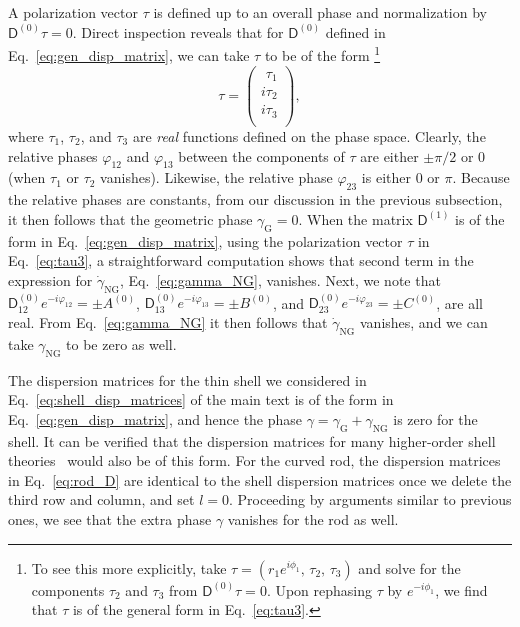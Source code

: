 \begin{subappendices}
A polarization vector $\tau$ is defined up to an overall phase and normalization by $\mathsf{D}^{(0)}\tau = 0$.
Direct inspection reveals that for $\mathsf{D}^{(0)}$ defined in Eq.~\eqref{eq:gen_disp_matrix}, we can take $\tau$ to be of the form%
\footnote{To see this more explicitly, take $\tau = (r_{1}e^{i\phi_{1}},\, \tau_{2},\, \tau_{3})$ and solve for the components $\tau_{2}$ and $\tau_{3}$ from $\mathsf{D}^{(0)}\tau = 0$.
  Upon rephasing $\tau$ by $e^{-i\phi_{1}}$, we find that $\tau$ is of the general form in Eq.~\eqref{eq:tau3}.
}
%
\begin{equation}
  \tau =
  \begin{pmatrix}
    \phantom{i}\tau_{1}\\
    i\tau_{2}\\
    i\tau_{3}\\
  \end{pmatrix},
  \label{eq:tau3}
\end{equation}
%
where $\tau_{1}$, $\tau_{2}$, and $\tau_{3}$ are \emph{real} functions defined on the phase space.
Clearly, the relative phases $\varphi_{12}$ and $\varphi_{13}$ between the components of $\tau$ are either $\pm \pi/2$ or $0$ (when $\tau_{1}$ or $\tau_{2}$ vanishes).
Likewise, the relative phase $\varphi_{23}$ is either $0$ or $\pi$.
Because the relative phases are constants, from our discussion in the previous subsection, it then follows that the geometric phase $\gamma_{\text{G}} = 0$.
When the matrix $\mathsf{D}^{(1)}$ is of the form in Eq.~\eqref{eq:gen_disp_matrix}, using the polarization vector $\tau$ in Eq.~\eqref{eq:tau3}, a straightforward computation shows that second term in the expression for $\dot{\gamma}_{\text{NG}}$, Eq.~\eqref{eq:gamma_NG}, vanishes.
Next, we note that $\mathsf{D}_{12}^{(0)}e^{-i\varphi_{12}} = \pm A^{(0)}$, $\mathsf{D}_{13}^{(0)}e^{-i\varphi_{13}} = \pm B^{(0)}$, and $\mathsf{D}_{23}^{(0)}e^{-i\varphi_{23}} = \pm C^{(0)}$, are all real.
From Eq.~\eqref{eq:gamma_NG} it then follows that $\dot{\gamma}_{\text{NG}}$ vanishes, and we can take $\gamma_{\text{NG}}$ to be zero as well.

The dispersion matrices for the thin shell we considered in Eq.~\eqref{eq:shell_disp_matrices} of the main text is of the form in Eq.~\eqref{eq:gen_disp_matrix}, and hence the phase $\gamma = \gamma_{\text{G}} + \gamma_{\text{NG}}$ is zero for the shell.
It can be verified that the dispersion matrices for many higher-order shell theories~\cite{doyle2021} would also be of this form.
For the curved rod, the dispersion matrices in Eq.~\eqref{eq:rod_D} are identical to the shell dispersion matrices once we delete the third row and column, and set $l=0$.
Proceeding by arguments similar to previous ones, we see that the extra phase $\gamma$ vanishes for the rod as well.


\end{subappendices}
